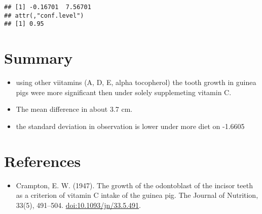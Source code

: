 \documentclass[
]{article}
\newenvironment{Shaded}{\begin{snugshade}}{\end{snugshade}}
\newcommand{\AttributeTok}[1]{\textcolor[rgb]{0.13,0.29,0.53}{#1}}
\newcommand{\CommentTok}[1]{\textcolor[rgb]{0.56,0.35,0.01}{\textit{#1}}}
\newcommand{\ConstantTok}[1]{\textcolor[rgb]{0.56,0.35,0.01}{#1}}
\newcommand{\DecValTok}[1]{\textcolor[rgb]{0.00,0.00,0.81}{#1}}
\newcommand{\FunctionTok}[1]{\textcolor[rgb]{0.13,0.29,0.53}{\textbf{#1}}}
\newcommand{\NormalTok}[1]{#1}
\newcommand{\OtherTok}[1]{\textcolor[rgb]{0.56,0.35,0.01}{#1}}
\newcommand{\SpecialCharTok}[1]{\textcolor[rgb]{0.81,0.36,0.00}{\textbf{#1}}}
\newcommand{\StringTok}[1]{\textcolor[rgb]{0.31,0.60,0.02}{#1}}
\providecommand{\tightlist}{%
  \setlength{\itemsep}{0pt}\setlength{\parskip}{0pt}}
\begin{document}
\begin{Shaded}
\end{Shaded}

\begin{verbatim}
## [1] -0.16701  7.56701
## attr(,"conf.level")
## [1] 0.95
\end{verbatim}

\section{Summary}\label{summary}

\begin{itemize}
\tightlist
\item
  using other viitamins (A, D, E, alpha tocopherol) the tooth growth in
  guinea pigs were more significant then under solely supplemeting
  vitamin C.
\item
  The mean difference in about 3.7 cm.
\item
  the standard deviation in observation is lower under more diet on
  -1.6605
\end{itemize}

\section{References}\label{references}

\begin{itemize}
\tightlist
\item
  Crampton, E. W. (1947). The growth of the odontoblast of the incisor
  teeth as a criterion of vitamin C intake of the guinea pig. The
  Journal of Nutrition, 33(5), 491--504. \url{doi:10.1093/jn/33.5.491}.
\end{itemize}
\end{document}
